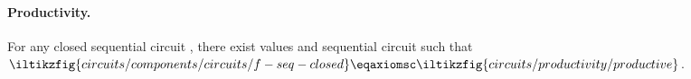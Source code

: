 \documentclass[10pt]{article}
\begin{document}
    \paragraph*{Productivity.}

    \begin{theorem}
        For any closed sequential circuit , there exist values  and sequential circuit  such that \(\iltikzfig{circuits/components/circuits/f-seq-closed} \eqaxiomsc \iltikzfig{circuits/productivity/productive}\).
    \end{theorem}

    \printbibliography[heading=bibintoc,title={References}]
\end{document}
